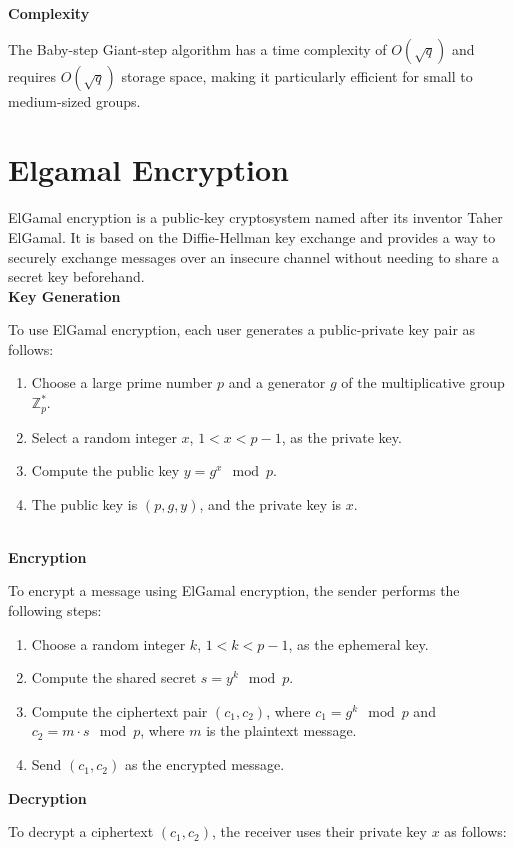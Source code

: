 \documentclass[11pt]{article}
\begin{document}
\textbf{Complexity}

The Baby-step Giant-step algorithm has a time complexity of $O(\sqrt{q})$ and requires $O(\sqrt{q})$ storage space, making it particularly efficient for small to medium-sized groups.

\section{Elgamal Encryption}
ElGamal encryption is a public-key cryptosystem named after its inventor Taher ElGamal. It is based on the Diffie-Hellman key exchange and provides a way to securely exchange messages over an insecure channel without needing to share a secret key beforehand.
\\

\textbf{Key Generation}

To use ElGamal encryption, each user generates a public-private key pair as follows:

\begin{enumerate}
    \item Choose a large prime number $p$ and a generator $g$ of the multiplicative group $\mathbb{Z}_p^*$.
    \item Select a random integer $x$, $1 < x < p-1$, as the private key.
    \item Compute the public key $y = g^x \mod p$.
    \item The public key is $(p, g, y)$, and the private key is $x$.
\end{enumerate}
\\

\textbf{Encryption}

To encrypt a message using ElGamal encryption, the sender performs the following steps:

\begin{enumerate}
    \item Choose a random integer $k$, $1 < k < p-1$, as the ephemeral key.
    \item Compute the shared secret $s = y^k \mod p$.
    \item Compute the ciphertext pair $(c_1, c_2)$, where $c_1 = g^k \mod p$ and $c_2 = m \cdot s \mod p$, where $m$ is the plaintext message.
    \item Send $(c_1, c_2)$ as the encrypted message.
\end{enumerate}

\textbf{Decryption}

To decrypt a ciphertext $(c_1, c_2)$, the receiver uses their private key $x$ as follows:
\end{document}
